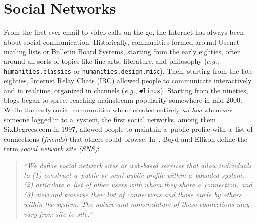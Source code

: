 

\chapter{Social Networks} \label{cha:social-networks}

\ifpdf
    \graphicspath{{3_social_networks/figures/PNG/}{3_social_networks/figures/PDF/}{3_social_networks/figures/}}
\else
    \graphicspath{{3_social_networks/figures/EPS/}{3_social_networks/figures/}}
\fi


From the first ever email to video calls on the go,
the Internet has always been about social communication.
Historically, communities formed around Usenet mailing lists or Bulletin Board Systems,
starting from the early eighties, often around all sorts of topics like fine arts,
literature, and philosophy (\emph{e.g.}, \texttt{humanities.classics}
or \texttt{humanities.design.misc}).
Then, starting from the late eighties, Internet Relay Chats (IRC)
allowed people to communicate interactively and in realtime, organized in channels
(\emph{e.g.}, \texttt{\#linux}).
Starting from the nineties, blogs began to spree,
reaching mainstream popularity somewhere in mid-2000.
While the early social communities where created entirely \emph{ad-hoc} whenever someone logged in to a~system,
the first social networks, among them SixDegrees.com in 1997,
allowed people to maintain a~public profile
with a~list of connections (\emph{friends}) that others could browse.
In~\cite{Ellison2007}, Boyd and Ellison define the term \emph{social network site (SNS)}:
\begin{quotation}
\textit{``We define social network sites as web-based services that allow individuals to
(1) construct a~public or semi-public profile within a~bounded system,
(2) articulate a~list of other users with whom they share a~connection, and
(3) view and traverse their list of connections and those made by others within the system.
The nature and nomenclature of these connections may vary from site to site.''}
\end{quotation}

